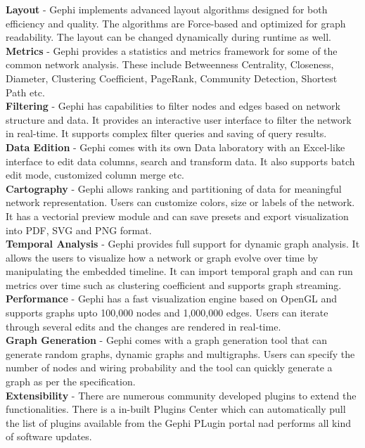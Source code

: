 \documentclass[11pt,a4paper,oneside]{article}
\begin{document}
    \textbf{Layout} - Gephi implements advanced layout algorithms designed for both efficiency and quality. The algorithms are Force-based and optimized for graph readability. The layout can be changed dynamically during runtime as well.\\	
	\textbf{Metrics} - Gephi provides a statistics and metrics framework for some of the common network analysis. These include Betweenness Centrality, Closeness, Diameter, Clustering Coefficient, PageRank, Community Detection, Shortest Path etc.\\	
	\textbf{Filtering} - Gephi has capabilities to filter nodes and edges based on network structure and data. It provides an interactive user interface to filter the network in real-time. It supports complex filter queries and saving of query results.\\	
	\textbf{Data Edition} -	Gephi comes with its own Data laboratory with an Excel-like interface to edit data columns, search and transform data. It also supports batch edit mode, customized column merge etc.\\	
	\textbf{Cartography} - Gephi allows ranking and partitioning of data for meaningful network representation. Users can customize colors, size or labels of the network. It has a vectorial preview module and can save presets and export visualization into PDF, SVG and PNG format.\\	
	\textbf{Temporal Analysis} - Gephi provides full support for dynamic graph analysis. It allows the users to visualize how a network or graph evolve over time by manipulating the embedded timeline. It can import temporal graph and can run metrics over time such as clustering coefficient and supports graph streaming.\\	
	\textbf{Performance} - Gephi has a fast visualization engine based on OpenGL and supports graphs upto 100,000 nodes and 1,000,000 edges. Users can iterate through several edits and the changes are rendered in real-time.\\	
	\textbf{Graph Generation} -	Gephi comes with a graph generation tool that can generate random graphs, dynamic graphs and multigraphs. Users can specify the number of nodes and wiring probability and the tool can quickly generate a graph as per the specification.\\	
	\textbf{Extensibility} - There are numerous community developed plugins to extend the functionalities. There is a in-built Plugins Center which can automatically pull the list of plugins available from the Gephi PLugin portal nad performs all kind of software updates.\\
	
\end{document}
